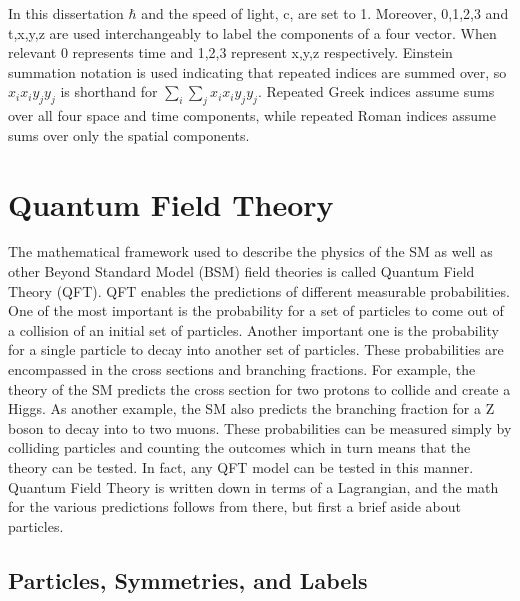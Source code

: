 In this dissertation $\hbar$ and the speed of light, c, are set to 1. Moreover, 0,1,2,3 and t,x,y,z are used interchangeably to label the components of a four vector. When relevant 0 represents time and 1,2,3 represent x,y,z respectively. Einstein summation notation is used indicating that repeated indices are summed over, so $x_ix_i y_jy_j$ is shorthand for $\sum_i\sum_j x_ix_i y_jy_j$. Repeated Greek indices assume sums over all four space and time components, while repeated Roman indices assume sums over only the spatial components. 

\section{Quantum Field Theory}


The mathematical framework used to describe the physics of the SM as well as other Beyond Standard Model (BSM) field theories is called Quantum Field Theory (QFT). QFT enables the predictions of different measurable probabilities. One of the most important is the probability for a set of particles to come out of a collision of an initial set of particles. Another important one is the probability for a single particle to decay into another set of particles. These probabilities are encompassed in the cross sections and branching fractions. For example, the theory of the SM predicts the cross section for two protons to collide and create a Higgs. As another example, the SM also predicts the branching fraction for a Z boson to decay into to two muons. These probabilities can be measured simply by colliding particles and counting the outcomes which in turn means that the theory can be tested. In fact, any QFT model can be tested in this manner. Quantum Field Theory is written down in terms of a Lagrangian, and the math for the various predictions follows from there, but first a brief aside about particles. 

\subsection{Particles, Symmetries, and Labels}

